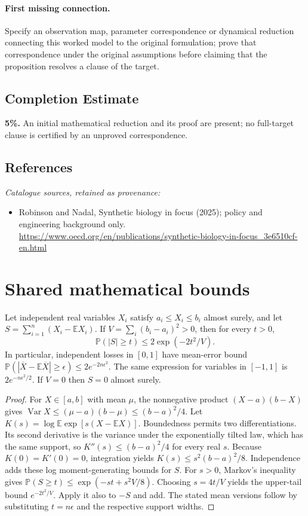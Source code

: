 \documentclass[11pt]{article}
\begin{document}
\paragraph{First missing connection.} Specify an observation map, parameter correspondence or dynamical reduction connecting this worked model to the original formulation; prove that correspondence under the original assumptions before claiming that the proposition resolves a clause of the target.
\subsection{Completion Estimate}
\textbf{5\%.} An initial mathematical reduction and its proof are present; no full-target clause is certified by an unproved correspondence.
\subsection{References}
\noindent\emph{Catalogue sources, retained as provenance:}
\begin{itemize}
\item Robinson and Nadal, Synthetic biology in focus (2025); policy and engineering background only. \url{https://www.oecd.org/en/publications/synthetic-biology-in-focus_3e6510cf-en.html}
\end{itemize}




\section{Shared mathematical bounds}\label{app:bounds}
\begin{lemma}\label{lem:bounded}
Let independent real variables $X_i$ satisfy $a_i\leq X_i\leq b_i$ almost surely,
and let $S=\sum_{i=1}^n(X_i-\mathbb{E} X_i)$. If
$V=\sum_i(b_i-a_i)^2>0$, then for every $t>0$,
\[
 \mathbb{P}(|S|\geq t)\leq 2\exp(-2t^2/V).
\]
In particular, independent losses in $[0,1]$ have mean-error bound
$\mathbb{P}(|\overline X-\mathbb{E}\overline X|\geq\epsilon)
\leq2e^{-2n\epsilon^2}$. The same expression for variables in $[-1,1]$
is $2e^{-n\epsilon^2/2}$. If $V=0$ then $S=0$ almost surely.
\end{lemma}
\begin{proof}
For $X\in[a,b]$ with mean $\mu$, the nonnegative product
$(X-a)(b-X)$ gives
$\operatorname{Var} X\leq(\mu-a)(b-\mu)\leq(b-a)^2/4$.
Let $K(s)=\log\mathbb{E}\exp[s(X-\mathbb{E} X)]$.
Boundedness permits two differentiations. Its second derivative is the variance
under the exponentially tilted law, which has the same support, so
$K''(s)\leq(b-a)^2/4$ for every real $s$.
Because $K(0)=K'(0)=0$, integration yields
$K(s)\leq s^2(b-a)^2/8$.
Independence adds these log moment-generating bounds for $S$.
For $s>0$, Markov's inequality gives
$\mathbb{P}(S\geq t)\leq\exp(-st+s^2V/8)$.
Choosing $s=4t/V$ yields the upper-tail bound $e^{-2t^2/V}$.
Apply it also to $-S$ and add. The stated mean versions follow by substituting
$t=n\epsilon$ and the respective support widths.
\end{proof}
\end{document}
